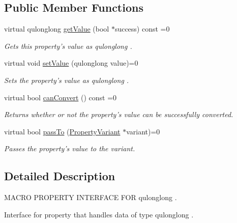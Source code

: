 \subsection*{Public Member Functions}
\begin{DoxyCompactItemize}
\item 
virtual qulonglong \hyperlink{class_i_u_long_long_property_acddc945a90cac8fa5921a9be25aaed13}{get\-Value} (bool $\ast$success) const =0
\begin{DoxyCompactList}\small\item\em Gets this property's value as qulonglong . \end{DoxyCompactList}\item 
virtual void \hyperlink{class_i_u_long_long_property_a59001a53d5cfdc3933038398fbeca269}{set\-Value} (qulonglong value)=0
\begin{DoxyCompactList}\small\item\em Sets the property's value as qulonglong . \end{DoxyCompactList}\item 
virtual bool \hyperlink{class_i_u_long_long_property_a905e766d258ebf63ed683a32aa2427a0}{can\-Convert} () const =0
\begin{DoxyCompactList}\small\item\em Returns whether or not the property's value can be successfully converted. \end{DoxyCompactList}\item 
virtual bool \hyperlink{class_i_u_long_long_property_afa78a1d7b4839a6af9c8e84fe61fb969}{pass\-To} (\hyperlink{class_property_variant}{Property\-Variant} $\ast$variant)=0
\begin{DoxyCompactList}\small\item\em Passes the property's value to the variant. \end{DoxyCompactList}\end{DoxyCompactItemize}


\subsection{Detailed Description}
M\-A\-C\-R\-O P\-R\-O\-P\-E\-R\-T\-Y I\-N\-T\-E\-R\-F\-A\-C\-E F\-O\-R qulonglong . 

Interface for property that handles data of type qulonglong . 

